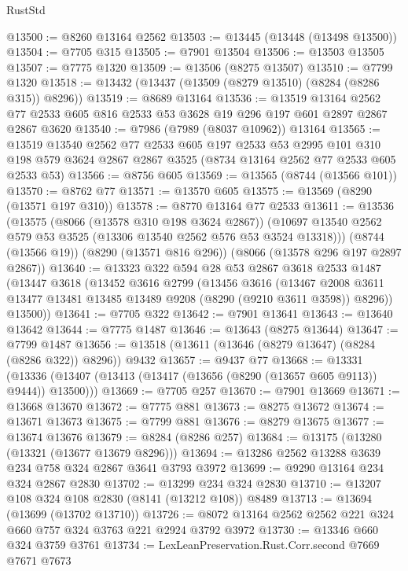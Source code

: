 \begin{lexlean}{RustStd}
\begin{coremodule}
@13500 := @8260 @13164 @2562
@13503 := @13445 (@13448 (@13498 @13500))
@13504 := @7705 @315
@13505 := @7901 @13504
@13506 := @13503 @13505
@13507 := @7775 @1320
@13509 := @13506 (@8275 @13507)
@13510 := @7799 @1320
@13518 := @13432 (@13437 (@13509 (@8279 @13510) (@8284 (@8286 @315)) @8296))
@13519 := @8689 @13164
@13536 := @13519
    @13164
    @2562
    @77
    @2533
    @605
    @816
    @2533
    @53
    @3628
    @19
    @296
    @197
    @601
    @2897
    @2867
    @2867
    @3620
@13540 := @7986 (@7989 (@8037 @10962)) @13164
@13565 := @13519
    @13540
    @2562
    @77
    @2533
    @605
    @197
    @2533
    @53
    @2995
    @101
    @310
    @198
    @579
    @3624
    @2867
    @2867
    @3525
    (@8734 @13164 @2562 @77 @2533 @605 @2533 @53)
@13566 := @8756 @605
@13569 := @13565 (@8744 (@13566 @101))
@13570 := @8762 @77
@13571 := @13570 @605
@13575 := @13569 (@8290 (@13571 @197 @310))
@13578 := @8770 @13164 @77 @2533
@13611 := @13536
    (@13575
      (@8066 (@13578 @310 @198 @3624 @2867))
      (@10697 @13540 @2562 @579 @53 @3525 (@13306 @13540 @2562 @576 @53 @3524 @13318)))
    (@8744 (@13566 @19))
    (@8290 (@13571 @816 @296))
    (@8066 (@13578 @296 @197 @2897 @2867))
@13640 := @13323
    @322
    @594
    @28
    @53
    @2867
    @3618
    @2533
    @1487
    (@13447
      @3618
      (@13452
        @3616
        @2799
        (@13456
          @3616
          (@13467 @2008 @3611 @13477 @13481 @13485 @13489 @9208 (@8290 (@9210 @3611 @3598)) @8296))
        @13500))
@13641 := @7705 @322
@13642 := @7901 @13641
@13643 := @13640 @13642
@13644 := @7775 @1487
@13646 := @13643 (@8275 @13644)
@13647 := @7799 @1487
@13656 := @13518 (@13611 (@13646 (@8279 @13647) (@8284 (@8286 @322)) @8296)) @9432
@13657 := @9437 @77
@13668 := @13331
    (@13336 (@13407 (@13413 (@13417 (@13656 (@8290 (@13657 @605 @9113)) @9444)) @13500)))
@13669 := @7705 @257
@13670 := @7901 @13669
@13671 := @13668 @13670
@13672 := @7775 @881
@13673 := @8275 @13672
@13674 := @13671 @13673
@13675 := @7799 @881
@13676 := @8279 @13675
@13677 := @13674 @13676
@13679 := @8284 (@8286 @257)
@13684 := @13175 (@13280 (@13321 (@13677 @13679 @8296)))
@13694 := @13286 @2562 @13288 @3639 @234 @758 @324 @2867 @3641 @3793 @3972
@13699 := @9290 @13164 @234 @324 @2867 @2830
@13702 := @13299 @234 @324 @2830
@13710 := @13207 @108 @324 @108 @2830 (@8141 (@13212 @108)) @8489
@13713 := @13694 (@13699 (@13702 @13710))
@13726 := @8072 @13164 @2562 @2562 @221 @324 @660 @757 @324 @3763 @221 @2924 @3792 @3972
@13730 := @13346 @660 @324 @3759 @3761
@13734 := LexLeanPreservation.Rust.Corr.second @7669 @7671 @7673

\end{coremodule}
\end{lexlean}
